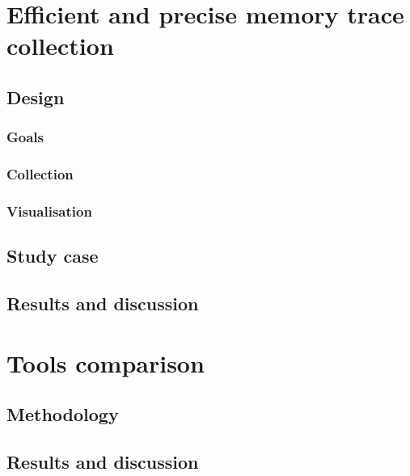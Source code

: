 
\section{Efficient and precise memory trace collection}

\subsection{Design}

\subsubsection{Goals}

\subsubsection{Collection}

\subsubsection{Visualisation}

\subsection{Study case}

\subsection{Results and discussion}

\section{Tools comparison}

\subsection{Methodology}


\subsection{Results and discussion}


